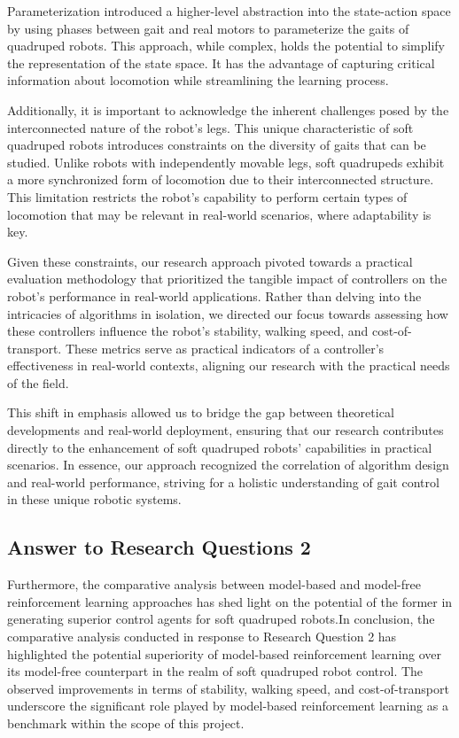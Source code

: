 Parameterization introduced a higher-level abstraction into the state-action space by using phases between gait and real motors to parameterize the gaits of quadruped robots. This approach, while complex, holds the potential to simplify the representation of the state space. It has the advantage of capturing critical information about locomotion while streamlining the learning process.

Additionally, it is important to acknowledge the inherent challenges posed by the interconnected nature of the robot's legs. This unique characteristic of soft quadruped robots introduces constraints on the diversity of gaits that can be studied. Unlike robots with independently movable legs, soft quadrupeds exhibit a more synchronized form of locomotion due to their interconnected structure. This limitation restricts the robot's capability to perform certain types of locomotion that may be relevant in real-world scenarios, where adaptability is key.

Given these constraints, our research approach pivoted towards a practical evaluation methodology that prioritized the tangible impact of controllers on the robot's performance in real-world applications. Rather than delving into the intricacies of algorithms in isolation, we directed our focus towards assessing how these controllers influence the robot's stability, walking speed, and cost-of-transport. These metrics serve as practical indicators of a controller's effectiveness in real-world contexts, aligning our research with the practical needs of the field.

This shift in emphasis allowed us to bridge the gap between theoretical developments and real-world deployment, ensuring that our research contributes directly to the enhancement of soft quadruped robots' capabilities in practical scenarios. In essence, our approach recognized the correlation of algorithm design and real-world performance, striving for a holistic understanding of gait control in these unique robotic systems.

\subsection{Answer to Research Questions 2}
Furthermore, the comparative analysis between model-based and model-free reinforcement learning approaches has shed light on the potential of the former in generating superior control agents for soft quadruped robots.In conclusion, the comparative analysis conducted in response to Research Question 2 has highlighted the potential superiority of model-based reinforcement learning over its model-free counterpart in the realm of soft quadruped robot control. The observed improvements in terms of stability, walking speed, and cost-of-transport underscore the significant role played by model-based reinforcement learning as a benchmark within the scope of this project.

